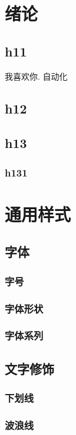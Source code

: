 \section[绪论]{绪论}
\subsection{h11}
{\color{blue} 我喜欢你.}
\lipsum[1-10]
自动化
\subsection{h12}
\lipsum[1-5]
\subsection{h13}
\lipsum[1-5]
\subsubsection{h131}
\lipsum[1-5]
\clearpage
\section{通用样式}
\subsection{字体}
    \subsubsection{字号}
    \subsubsection{字体形状}
    \subsubsection{字体系列}
\subsection{文字修饰}
    \subsubsection{下划线}
    \subsubsection{波浪线}
